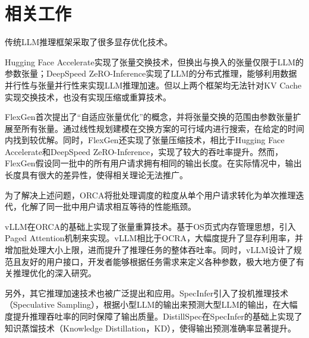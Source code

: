 \section{相关工作}
传统LLM推理框架采取了很多显存优化技术。 
\par
Hugging Face Accelerate\cite{Huggingface-Accelerate}实现了张量交换技术，但换出与换入的张量仅限于LLM的参数张量；DeepSpeed ZeRO-Inference\cite{GPT-175B资源消耗}实现了LLM的分布式推理，能够利用数据并行性与张量并行性来实现LLM推理加速。但以上两个框架均无法针对KV Cache实现交换技术，也没有实现压缩或重算技术。 
\par
FlexGen\cite{Swapping}首次提出了“自适应张量优化”的概念，并将张量交换的范围由参数张量扩展至所有张量。通过线性规划建模在交换方案的可行域内进行搜索，在给定的时间内找到较优解。同时，FlexGen还实现了张量压缩技术，相比于Hugging Face Accelerate和DeepSpeed ZeRO-Inference，实现了较大的吞吐率提升。然而，FlexGen假设同一批中的所有用户请求拥有相同的输出长度。在实际情况中，输出长度具有很大的差异性，使得相关理论无法推广。
\par
为了解决上述问题，ORCA\cite{ORCA}将批处理调度的粒度从单个用户请求转化为单次推理迭代，化解了同一批中用户请求相互等待的性能瓶颈。 
\par
vLLM\cite{vLLM}在ORCA的基础上实现了张量重算技术。基于OS页式内存管理思想，引入Paged Attention机制来实现。vLLM相比于OCRA，大幅度提升了显存利用率，并增加批处理大小上限，进而提升了推理任务的整体吞吐率。同时，vLLM设计了规范且友好的用户接口，开发者能够根据任务需求来定义各种参数，极大地方便了有关推理优化的深入研究。 
\par
另外，其它推理加速技术也被广泛提出和应用。SpecInfer\cite{SpecInfer}引入了投机推理技术（Speculative Sampling），根据小型LLM的输出来预测大型LLM的输出，在大幅度提升推理吞吐率的同时保障了输出质量。DistillSpec\cite{DistillSpec}在SpecInfer的基础上实现了知识蒸馏技术（Knowledge Distillation，KD），使得输出预测准确率显著提升。
